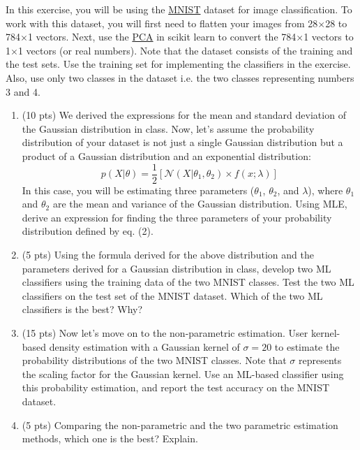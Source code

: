 \documentclass[10pt,letter,notitlepage]{article}
\newcommand{\blue}[1]{{\color{blue}#1}}
\newcommand{\magenta}[1]{{\color{magenta}#1}}
\newcounter{exercise}
\begin{document}
\begin{exercise}
In this exercise, you will be using the \href{https://pytorch.org/vision/stable/datasets.html#mnist}{\magenta{MNIST}} dataset for image classification. To work with this dataset, you will first need to flatten your images from 28$\times$28 to 784$\times$1 vectors. Next, use the \href{https://scikit-learn.org/stable/modules/generated/sklearn.decomposition.PCA.html}{\magenta{PCA}} in scikit learn to convert the 784$\times$1 vectors to 1$\times$1 vectors (or real numbers). \blue{Note} that the dataset consists of the training and the test sets. Use the training set for implementing the classifiers in the exercise. \blue{Also}, use only two classes in the dataset i.e. the two classes representing numbers 3 and 4.

\begin{enumerate} 
    \item (10 pts) We derived the expressions for the mean and standard deviation of the Gaussian distribution in class. Now, let's assume the probability distribution of your dataset is not just a single Gaussian distribution but a product of a Gaussian distribution and an exponential distribution:
    \begin{equation}
        p(X|\theta) = \frac{1}{2} [\mathcal{N}(X|\theta_1,\theta_2) \times f(x;\lambda)] 
    \end{equation}
    In this case, you will be estimating three parameters ($\theta_1$, $\theta_2$, and $\lambda$), where $\theta_1$ and $\theta_2$ are the mean and variance of the Gaussian distribution. Using MLE, derive an expression for finding the three parameters of your probability distribution defined by eq. (2).
    \item (5 pts) Using the formula derived for the above distribution and the parameters derived for a Gaussian distribution in class, develop two ML classifiers using the training data of the two MNIST classes. Test the two ML classifiers on the test set of the MNIST dataset. Which of the two ML classifiers is the best? Why?  
    \item (15 pts) Now let's move on to the non-parametric estimation. User kernel-based density estimation with a Gaussian kernel of $\sigma=20$ to estimate the probability distributions of the two MNIST classes. Note that $\sigma$ represents the scaling factor for the Gaussian kernel. Use an ML-based classifier using this probability estimation, and report the test accuracy on the MNIST dataset. 
    \item (5 pts) Comparing the non-parametric and the two parametric estimation methods, which one is the best? Explain.
\end{enumerate}
\end{exercise}
\end{document}
